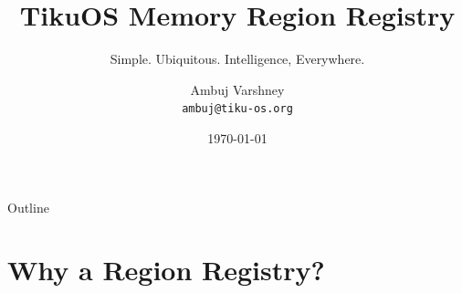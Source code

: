 \documentclass[aspectratio=169, 10pt]{beamer}
\title[TikuOS Region]{TikuOS Memory Region Registry}
\subtitle{Simple. Ubiquitous. Intelligence, Everywhere.}
\author[Ambuj Varshney]{Ambuj Varshney \\ \texttt{ambuj@tiku-os.org}}
\date{\today}
\begin{document}
\begin{frame}
\titlepage
\end{frame}

\begin{frame}{Outline}
\tableofcontents
\end{frame}

\section{Why a Region Registry?}
\end{document}
